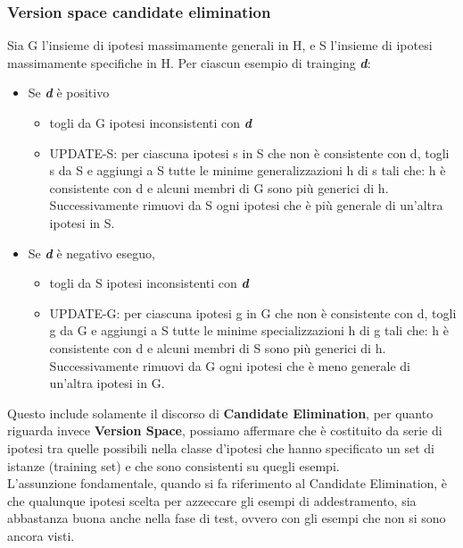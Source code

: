 \subsubsection{Version space candidate elimination}
Sia G l'insieme di ipotesi massimamente generali in H, e S l'insieme di ipotesi massimamente specifiche in H. Per ciascun esempio di trainging \textit{\textbf{d}}:
\begin{itemize}
    \item Se \textbf{\textit{d}} è positivo
        \begin{itemize}
            \item togli da G ipotesi inconsistenti con \textit{\textbf{d}}
            \item UPDATE-S: per ciascuna ipotesi s in S che non è consistente con d, togli s da S e aggiungi a S tutte le minime generalizzazioni h di s tali che: h è consistente con d e alcuni membri di G sono più generici di h. Successivamente rimuovi da S ogni ipotesi che è più generale di un'altra ipotesi in S.
        \end{itemize}
    \item Se \textbf{\textit{d}} è negativo eseguo,\begin{itemize}
        \item togli da S ipotesi inconsistenti con \textit{\textbf{d}}
            \item UPDATE-G: per ciascuna ipotesi g in G che non è consistente con d, togli g da G e aggiungi a S tutte le minime specializzazioni h di g tali che: h è consistente con d e alcuni membri di S sono più generici di h. Successivamente rimuovi da G ogni ipotesi che è meno generale di un'altra ipotesi in G.
        \end{itemize}
\end{itemize}
Questo include solamente il discorso di \textbf{Candidate Elimination}, per quanto riguarda invece \textbf{Version Space}, possiamo affermare che è costituito da serie di ipotesi tra quelle possibili nella classe d’ipotesi che hanno specificato un set di istanze (training set) e che sono consistenti su quegli esempi.\\ L’assunzione fondamentale, quando si fa riferimento al Candidate Elimination, è che qualunque ipotesi scelta per azzeccare gli esempi di addestramento, sia abbastanza buona anche nella fase di test, ovvero con gli esempi che non si sono ancora visti.
